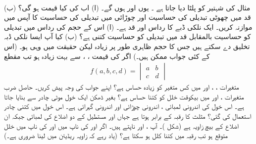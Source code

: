 \\
مثال  کی شہتیر کو پلٹا دیا جاتا ہے  ۔ یوں   اور  ہوں گے۔ (ا) اب  کی کیا قیمت ہو گی؟ (ب) قد میں چھوٹی تبدیلی کی حساسیت     اور  چوڑائی میں تبدیلی  کی  حساسیت کا آپس میں  موازنہ کریں۔  
ایک نلکی ڈبے کا رداس  اور قد  ہے۔ (ا)  اس کے  حجم کی    رداس میں تبدیلی کو حساسیت  بالمقابل قد میں تبدیلی   کو  حساسیت کتنی  ہے؟ (ب)  کیا آپ ایسا نلکی ڈبہ تخلیق دے سکتے ہیں جس کا حجم  ظاہری طور پر زیادہ   لیکن حقیقت میں  وہی ہو۔ (اس کے کئی جواب ممکن ہیں۔)
اگر  کی قیمت ، ،  سے بہت زیادہ ہو تب   مقطع 
\begin{align*}
f(a,b,c,d)=\begin{vmatrix}a&b\\ c&d \end{vmatrix}
\end{align*}
متغیرات ، ،  اور  میں کس متغیر کو زیادہ حساس ہے؟ اپنے جواب  کی وجہ پیش کریں۔
حاصل ضرب  متغیرات ،  اور  میں بیکوقت   خلل  کو کتنا حساس ہے؟
بغیر ڈھکن ایک خول      موٹی چادر سے بنایا جاتا ہے۔ اس خول کی اندرونی لمبائی ،  اندرونی چوڑائی  اور اندرونی گہرائی  ہے۔ اس خول میں کتنی چادر استعمال کی گئی؟
مثلث  کا رقبہ   کے برابر ہوتا ہے جہاں  اور  مستطیل کے دو اضلاع کی لمبائی جبکہ  ان  اضلاع  کے بیچ زاویہ ہے (شکل )۔ آپ ،
  اور  ناپتے ہیں۔ اگر  اور  کی ناپ میں  اور  کی ناپ میں   خلل متوقع ہو تب  رقبہ میں کتنا کلل ہو سکتا ہے؟ (یاد رہے کہ زاویہ   ریڈیئن میں لینا ضروری ہے۔) 
